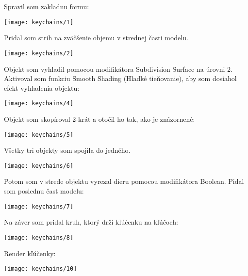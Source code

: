        Spravil som zakladnu formu:
        \begin{center}
          \texttt{[image: keychains/1]}
        \end{center}

        Pridal som strih na zväčšenie objemu v strednej časti modelu. \\
        \begin{center}
          \texttt{[image: keychains/2]}
        \end{center}

        Objekt som vyhladil pomocou modifikátora Subdivision Surface na úrovni 2. Aktivoval som funkciu Smooth Shading (Hladké tieňovanie), aby som dosiahol efekt vyhladenia objektu: \\
        \begin{center}
          \texttt{[image: keychains/4]}
        \end{center}

        Objekt som skopíroval 2-krát a otočil ho tak, ako je znázornené: \\
        \begin{center}
          \texttt{[image: keychains/5]}
        \end{center}

        Všetky tri objekty som spojila do jedného. \\
        \begin{center}
          \texttt{[image: keychains/6]}
        \end{center}

        Potom som v strede objektu vyrezal dieru pomocou modifikátora Boolean. Pidal som poslednu čast modelu: \\
        \begin{center}
          \texttt{[image: keychains/7]}
        \end{center}

        Na záver som pridal kruh, ktorý drží kľúčenku na kľúčoch: \\
        \begin{center}
          \texttt{[image: keychains/8]}
        \end{center}

        \newpage
        Render kľúčenky: \\
        \begin{center}
          \texttt{[image: keychains/10]}
        \end{center}

